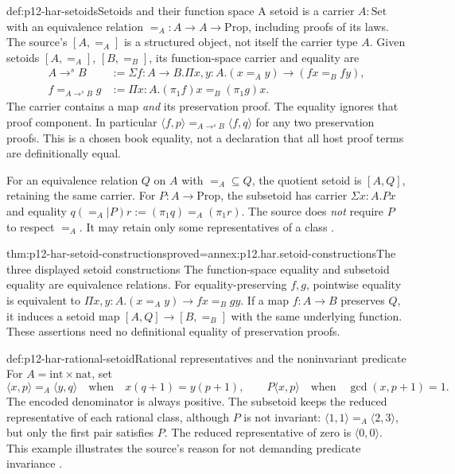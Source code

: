 \begin{hbdefinition}{def:p12-har-setoids}{Setoids and their function space}
A setoid is a carrier \(A:\mathrm{Set}\) with an equivalence relation
\(=_A:A\to A\to\mathrm{Prop}\), including proofs of its laws.
The source's \([A,=_A]\) is a structured object, not itself the
carrier type \(A\). Given setoids \([A,=_A]\), \([B,=_B]\),
its function-space carrier and equality are
\[
\begin{aligned}
 A\to^s B&:=\Sigma f:A\to B.
      \Pi x,y:A.(x=_A y)\to(fx=_B fy),\\
 f=_{A\to^s B}g&:=\Pi x:A.(\pi_1f)x=_B(\pi_1g)x.
\end{aligned}
\]
The carrier contains a map \emph{and} its preservation proof. The equality
ignores that proof component. In particular
\(\langle f,p\rangle=_{A\to^s B}\langle f,q\rangle\) for any
two preservation proofs. This is a chosen book equality, not a declaration
that all host proof terms are definitionally equal.

For an equivalence relation \(Q\) on \(A\) with \(=_A\subseteq Q\),
the quotient setoid is \([A,Q]\), retaining the same carrier.
For \(P:A\to\mathrm{Prop}\), the subsetoid has carrier
\(\Sigma x:A.Px\) and equality
\(q(=_A\vert P)r:=(\pi_1q)=_A(\pi_1r)\).
The source does \emph{not} require \(P\) to respect \(=_A\).
It may retain only some representatives of a class
\cite[pp.~1172--1173]{BarendregtGeuvers2001}.
\end{hbdefinition}

\begin{hbtheorem}{thm:p12-har-setoid-constructions}{proved=annex:p12.har.setoid-constructions}{The three displayed setoid constructions}
The function-space equality and subsetoid equality are equivalence
relations. For equality-preserving \(f,g\), pointwise equality is
equivalent to
\(\Pi x,y:A.(x=_A y)\to fx=_B gy\).
If a map \(f:A\to B\) preserves \(Q\), it induces a
setoid map \([A,Q]\to[B,=_B]\) with the same underlying function.
These assertions need no definitional equality of preservation proofs.
\end{hbtheorem}

\begin{hbexample}{def:p12-har-rational-setoid}{Rational representatives and the noninvariant predicate}
For \(A=\mathrm{int}\times\mathrm{nat}\), set
\[
 \langle x,p\rangle=_A\langle y,q\rangle
       \quad\text{when}\quad x(q+1)=y(p+1),\qquad
 P\langle x,p\rangle\quad\text{when}\quad
       \gcd(x,p+1)=1.
\]
The encoded denominator is always positive. The subsetoid keeps the reduced
representative of each rational class, although \(P\) is not invariant:
\(\langle1,1\rangle=_A\langle2,3\rangle\), but only the first
pair satisfies \(P\). The reduced representative of zero is
\(\langle0,0\rangle\). This example illustrates the source's
reason for not demanding predicate invariance
\cite[p.~1173]{BarendregtGeuvers2001}.
\end{hbexample}

